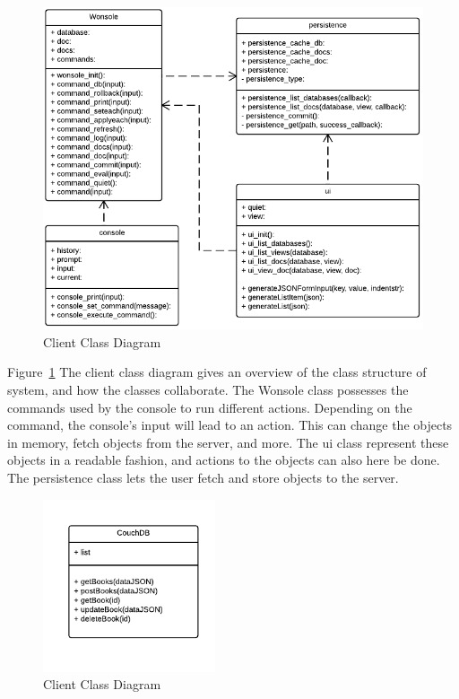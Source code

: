 \begin{figure}[h]
\centering
\includegraphics[width=6in]{image/architecture/clientClassDiagram.png}
\caption{Client Class Diagram}
\label{figure:clientClassDiagram}
\end{figure}

Figure~\ref{figure:clientClassDiagram} The client class diagram gives an overview of the class structure of system, and how the classes collaborate. The Wonsole class possesses the commands used by the console to run different actions. Depending on the command, the console's input will lead to an action. This can change the objects in memory, fetch objects from the server, and more. The ui class represent these objects in a readable fashion, and actions to the objects can also here be done. The persistence class lets the user fetch and store objects to the server.

\begin{figure}[h]
\centering
\includegraphics[width=2in]{image/architecture/serverClassDiagram.png}
\caption{Client Class Diagram}
\label{figure:serverClassDiagram}
\end{figure}

